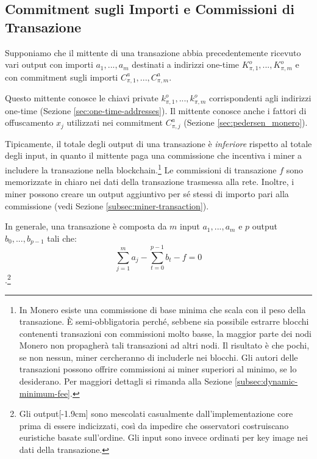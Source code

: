 \subsection{Commitment sugli Importi e Commissioni di Transazione}
\label{sec:commitments-and-fees}

Supponiamo che il mittente di una transazione abbia precedentemente ricevuto vari output con importi $a_1, ..., a_m$ destinati a indirizzi one-time $K^o_{\pi,1}, ..., K^o_{\pi,m}$ e con commitment sugli importi $C^a_{\pi,1}, ..., C^a_{\pi,m}$.

Questo mittente conosce le chiavi private $k^o_{\pi,1}, ..., k^o_{\pi,m}$ corrispondenti agli indirizzi one-time (Sezione \ref{sec:one-time-addresses}). Il mittente conosce anche i fattori di offuscamento $x_j$ utilizzati nei commitment $C^a_{\pi,j}$ (Sezione \ref{sec:pedersen_monero}).

Tipicamente, il totale degli output di una transazione è {\em inferiore} rispetto al totale degli input, in quanto il mittente paga una commissione che incentiva i miner a includere la transazione nella blockchain.\footnote{In Monero esiste una commissione di base minima che scala con il peso della transazione. È semi-obbligatoria perché, sebbene sia possibile estrarre blocchi contenenti transazioni con commissioni molto basse, la maggior parte dei nodi Monero non propagherà tali transazioni ad altri nodi. Il risultato è che pochi, se non nessun, miner cercheranno di includerle nei blocchi. Gli autori delle transazioni possono offrire commissioni ai miner superiori al minimo, se lo desiderano. Per maggiori dettagli si rimanda alla Sezione \ref{subsec:dynamic-minimum-fee}.} Le commissioni di transazione $f$ sono memorizzate in chiaro nei dati della transazione trasmessa alla rete. Inoltre, i miner possono creare un output aggiuntivo per sé stessi di importo pari alla commissione (vedi Sezione \ref{subsec:miner-transaction}).

In generale, una transazione è composta da $m$ input \(a_1, ..., a_m\) e $p$ output \(b_0, ..., b_{p-1}\) tali che:\\ \[\sum\limits_{j=1}^m a_j - \sum\limits_{t=0}^{p-1} b_t - f = 0\].\footnote{Gli output[-1.9cm] sono mescolati casualmente dall’implementazione core prima di essere indicizzati, così da impedire che osservatori costruiscano euristiche basate sull’ordine. Gli input sono invece ordinati per key image nei dati della transazione.}

